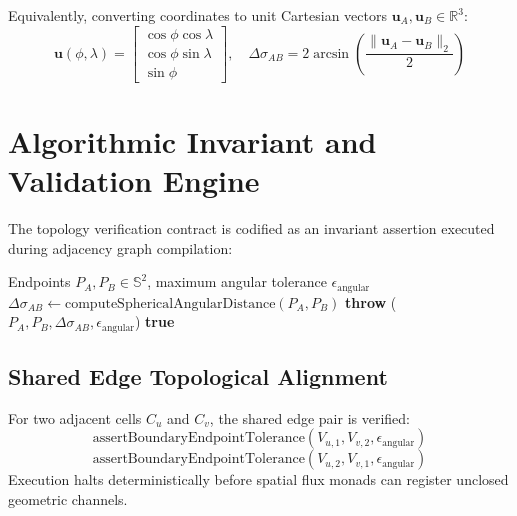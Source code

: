 \documentclass[11pt,a4paper]{article}
\begin{document}
Equivalently, converting coordinates to unit Cartesian vectors $\mathbf{u}_A, \mathbf{u}_B \in \mathbb{R}^3$:
\begin{equation}
\mathbf{u}(\phi, \lambda) = \begin{bmatrix} \cos\phi \cos\lambda \\ \cos\phi \sin\lambda \\ \sin\phi \end{bmatrix}, \quad
\Delta\sigma_{AB} = 2 \arcsin\left(\frac{\|\mathbf{u}_A - \mathbf{u}_B\|_2}{2}\right)
\end{equation}

\section{Algorithmic Invariant and Validation Engine}

The topology verification contract is codified as an invariant assertion executed during adjacency graph compilation:

\begin{algorithm}[H]
\caption{Boundary Endpoint Tolerance Invariant Assertion}
\begin{algorithmic}[1]
\REQUIRE Endpoints $P_A, P_B \in \mathbb{S}^2$, maximum angular tolerance $\epsilon_{\text{angular}}$
\STATE $\Delta\sigma_{AB} \leftarrow \text{computeSphericalAngularDistance}(P_A, P_B)$
    \STATE \textbf{throw} ($P_A, P_B, \Delta\sigma_{AB}, \epsilon_{\text{angular}}$)
\ENDIF
\RETURN \textbf{true}
\end{algorithmic}
\end{algorithm}

\subsection{Shared Edge Topological Alignment}
For two adjacent cells $C_u$ and $C_v$, the shared edge pair is verified:
\begin{equation}
\text{assertBoundaryEndpointTolerance}(V_{u,1}, V_{v,2}, \epsilon_{\text{angular}})
\end{equation}
\begin{equation}
\text{assertBoundaryEndpointTolerance}(V_{u,2}, V_{v,1}, \epsilon_{\text{angular}})
\end{equation}
Execution halts deterministically before spatial flux monads can register unclosed geometric channels.
\end{document}
